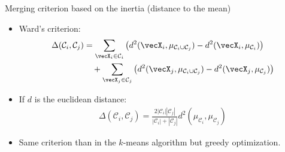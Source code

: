 \documentclass{beamer}\usepackage[]{graphicx}\usepackage[]{color}
\begin{document}
\begin{frame}[allowframebreaks]
\framebreak
\begin{block}{Merging criterion based on the inertia (distance to the mean)}
\begin{itemize}
\item Ward's criterion:
\begin{align*}
\Delta(\mathcal{C}_i, \mathcal{C}_j)
& = \sum_{\vecX_i \in \mathcal{C}_i} \left( d^2(\vecX_i,
\mu_{\mathcal{C}_i \cup \mathcal{C}_j} ) - d^2(\vecX_i,
\mu_{\mathcal{C}_i}) \right) \\
& \quad + \sum_{\vecX_j \in \mathcal{C}_j} \left( d^2(\vecX_j,
\mu_{\mathcal{C}_i \cup \mathcal{C}_j} ) - d^2(\vecX_j,
\mu_{\mathcal{C}_j}) \right)
\end{align*}
\item If $d$ is the euclidean distance:
\begin{align*}
\Delta(\mathcal{C}_i, \mathcal{C}_j) = \frac{2
|\mathcal{C}_i||\mathcal{C}_j|}{|\mathcal{C}_i|+ |\mathcal{C}_j|}
d^2(\mu_{\mathcal{C}_i}, \mu_{\mathcal{C}_j})
\end{align*}
\end{itemize}
\end{block}
\begin{itemize}
\item Same criterion than in the $k$-means algorithm but greedy optimization.
\end{itemize}
\end{frame}
\end{document}
